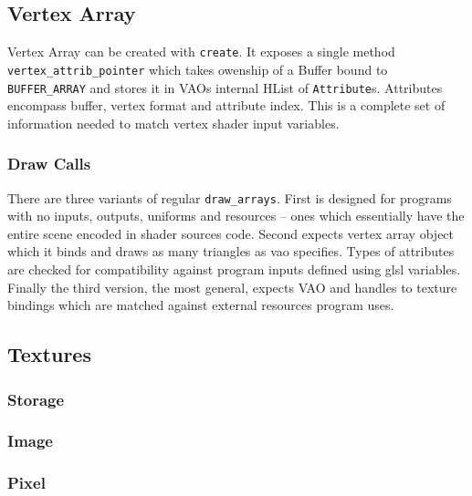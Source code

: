 \subsection{Vertex Array}

Vertex Array can be created with \texttt{create}. It exposes a single method \texttt{vertex\_attrib\_pointer} which takes owenship of a Buffer bound to \texttt{BUFFER\_ARRAY}
and stores it in VAOs internal HList of \texttt{Attribute}s.
Attributes encompass buffer, vertex format and attribute index. This is a complete set of information needed to match vertex shader input variables.

\subsubsection{Draw Calls}

There are three variants of regular \texttt{draw\_arrays}. First is designed for programs with no inputs, outputs, uniforms and resources -- ones which essentially have the entire scene
encoded in shader sources code. 
Second expects vertex array object which it binds and draws as many triangles as vao specifies. Types of attributes are checked for compatibility against program inputs defined using glsl variables.
Finally the third version, the most general, expects VAO and handles to texture bindings which are matched against external resources program uses. 

\subsection{Textures}

\subsubsection{Storage}

\subsubsection{Image}

\subsubsection{Pixel}
